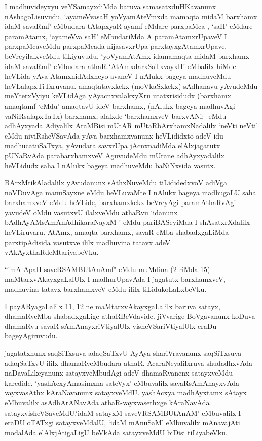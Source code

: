\begin{artha}
 I madhuvideyxyu veYSamayxdiMda baruva samasatxduHKavanunx nAshagoLi\-suvudu. `ayameVvasaH yoV\s yamAteVmxda mamaqta midaM barxhamx idaM savaRmf' eMbu\-dara tAtapxyaR ayamf eMdare parxpaMca , `saH' eMdare paramAtamx, `ayameVva saH' eMbudariMda A paramAtamxrUpaveV I parxpaMcaveMdu parxpaMcada nijasavxrUpa parxtayxgAtamxrUpave. beVreyilalxveMdu tiLiyuvudu. `yoV\s yamAtAmx \-idamamaqta midaM barxhamx idaM savaRmf' eMbudara athaR-`AtAmxdarxSaTxvayxH' eMbalilx hiMde heVLida yAva AtamxnidAdxneyo avaneV I nAlukx bageya madhuveMdu heVLalapxTiTx\-ruvanu. amaqtatavxkekx (moVkaSxkekx) sAdhanavu yAvudeMdu meYterxVyiyu keVLi\-dAga yAyacnxvalakxyXru utatxrisidudx (barxhamx amaqtamf `eMdu' amaqtavU ideV \-barxhamx, (nAlukx bageya madhuvAgi vaNiRsalapxTaTx) barxhamx, alalxde `barxhamxveV barxvANi:- eMdu adhAyxyada Adiyalilx AraMBisi mUtAR mUtaRbArxhamxNadalilx `neVti neVti' eMdu niviRsheVSavAda yAva barxhamxvanunx heVLididxto adeV idu madhucatuSaTxya, \break yAvudara savxrUpa jAcnxnadiMda elAlxjagatutx pUNaRvAda parabarxhamxveV Aguvu\-deMdu mUrane adhAyxyadalilx heVLidudx saha I nAlukx bageya madhuveMdu baNiNxsida \-vasutx.
\end{artha}

\begin{artha}
BArxMtikAladalilx yAvudanunx sAthxNuveMdu tiLididedxvoV adiVga noVDuvAga manuSayxne eMdu 
heVLuvaMte I nAlukx bageya madhugaLU saha barxhamxveV eMdu heVLide, barxhamxkekx 
beVreyAgi paramAthaRvAgi yavudeV oMdu vasutxvU ilalxveMdu athaRvu `idanunx 
bAdhAyAMsAmAnAdhikaraNayxM ' eMdu pariBASeyiMda I shAsatxrXdalilx heVLiruvaru. AtAmx, 
amaqta barxhamx, savaR eMba shabadxgaLiMda parxtipAdisida vasutxve ililx madhuvina 
tatavx adeV vAkAyxthaRdeMtariyabeVku.

``imA ApaH saveRSAMBUtAnAmf" eMdu muMdina (2 riMda 15) maMtarxvAkayxgaLalUlx I madhurUpavAda I jagatutx barxhamxveV, madhuvina tatavx barxhamxveV eMdu ililx tiLidukoLaLxbeVku.
\end{artha}

\begin{artha}
I payARyagaLalilx 11, 12 ne maMtarxvAkayxgaLalilx baruva satayx, dhamaRveMba shabadxgaLige athaRBeVdavide. jiVvarige BoVgavanunx koDuva dhamaRvu savaR sAmAnayxriVtiyalUlx visheVSariVtiyalUlx eraDu bageyAgiruvudu.

jagatatxnunx saqSiTxsuva adaqSaTxvU AyAya shariVravanunx saqSiTxsuva adaqSaTxvU ililx dhamaRveMbudara  athaR. AcaraNeyalilxruva shudadhxvAda naDavaLikeyanunx satayxveMbudAgi adeV dhamaRvanenx satayxveMdu karedide. `yashAcxyAmasimxna sateVyx' eMbuvalilx savaRsAmAnayxvAda vayxvasAthx kAraNavanunx satayxveMdU. yashAcxya madhAyxtamx sAtayx eMbuvalilx asAdhArANavAda athaR-vayxvasethxge kAraNavAda satayxvisheVSaveMdU.`idaM satayxM saveVRSAMBUtAnAM' eMbuvalilx I eraDU oTATxgi satayxveMdalU, `idaM mAnuSaM' eMbuvalilx mAnavajAti modalAda elAlxjAtigaLigU beVkAda satayxveMdU biDisi tiLiyabeVku.
\end{artha}


